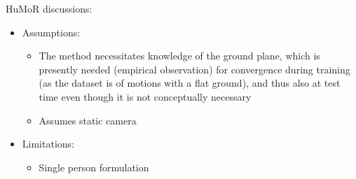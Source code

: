 HuMoR discussions:
\begin{itemize}
    \item Assumptions:
    \begin{itemize}
        \item The method necessitates knowledge of the ground plane, which is presently needed (empirical observation) for convergence during training (as the dataset is of motions with a flat ground), and thus also at test time even though it is not conceptually necessary
        \item Assumes static camera
    \end{itemize}
    \item Limitations:
    \begin{itemize}
        \item Single person formulation
    \end{itemize}
\end{itemize}

